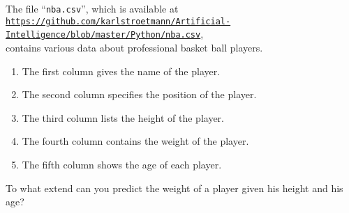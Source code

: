 \exercise
The file ``\texttt{nba.csv}'', which is available at
\\[0.2cm]
\hspace*{0.3cm}
\href{https://github.com/karlstroetmann/Artificial-Intelligence/blob/master/Python/nba.csv}{\texttt{https://github.com/karlstroetmann/Artificial-Intelligence/blob/master/Python/nba.csv}},
\\[0.2cm]
contains various data about professional basket ball players.
\begin{enumerate}
\item The first column gives the name of the player.
\item The second column specifies the position of the player.
\item The third column lists the height of the player.
\item The fourth column contains the weight of the player.
\item The fifth column shows the age of each player.
\end{enumerate}
To what extend can you predict the weight of a player given his height and his age?
\eox

